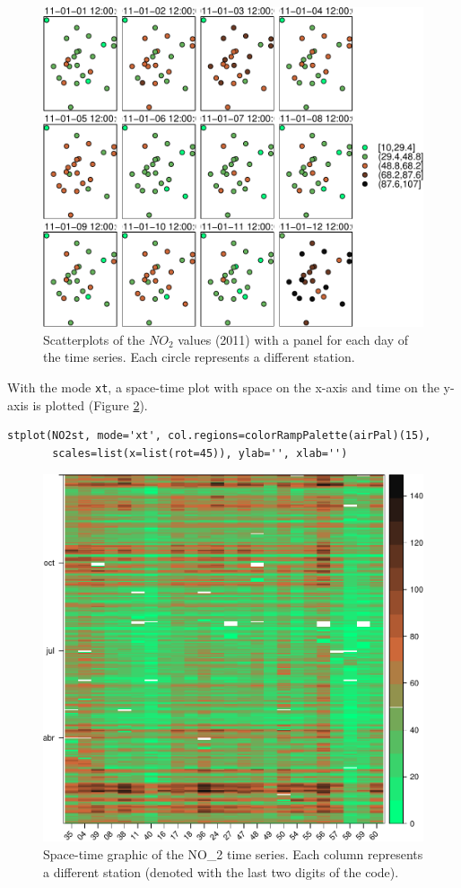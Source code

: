 \begin{figure}[htb]
\centering
\includegraphics[width=.9\linewidth]{figs/NO2STxy.pdf}
\caption{\label{fig:NO2STxy}Scatterplots of the $NO_2$ values (2011) with a panel for each day of the time series. Each circle represents a different station.}
\end{figure}

With the mode \texttt{xt}, a space-time plot with space on the x-axis and
time on the y-axis is plotted (Figure \ref{fig:NO2hovmoller}).

\lstset{language=R,numbers=none}
\begin{lstlisting}
stplot(NO2st, mode='xt', col.regions=colorRampPalette(airPal)(15),
       scales=list(x=list(rot=45)), ylab='', xlab='')
\end{lstlisting}

\begin{figure}[htb]
\centering
\includegraphics[width=.9\linewidth]{figs/NO2hovmoller.pdf}
\caption{\label{fig:NO2hovmoller}Space-time graphic of the NO\_2 time series. Each column represents a different station (denoted with the last two digits of the code).}
\end{figure}

